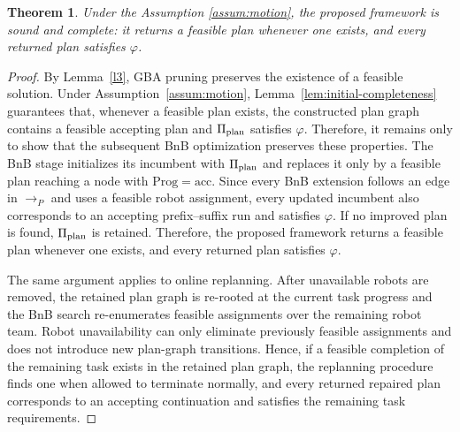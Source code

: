 \documentclass[lettersize,journal]{IEEEtran}
\theoremstyle{italiclemma}
\theoremstyle{italiclemma}
\newtheorem{theorem}{Theorem}
\theoremstyle{definition}
\begin{document}
\begin{theorem}\label{thm:soundness_completeness}
Under the Assumption \ref{assum:motion}, the proposed framework is sound and complete: it returns a feasible plan whenever one exists, and every returned plan satisfies $\varphi$.
\end{theorem}
\begin{proof}
By Lemma~\ref{l3}, GBA pruning preserves the existence of a feasible solution. Under Assumption~\ref{assum:motion},
Lemma~\ref{lem:initial-completeness} guarantees that, whenever a feasible plan exists, the constructed plan graph contains a feasible accepting plan and $\Pi_{\rm plan}$ satisfies $\varphi$.  Therefore, it remains only to show that the subsequent BnB optimization preserves these properties.
The BnB stage initializes its incumbent with $\Pi_{\rm plan}$ and replaces it only by a feasible plan reaching a node with $\mathrm{Prog}=\mathrm{acc}$. Since every BnB extension follows an edge in $\rightarrow_P$ and uses a feasible robot assignment, every updated incumbent also corresponds to an accepting prefix--suffix run and satisfies $\varphi$. If no improved plan is found, $\Pi_{\rm plan}$ is retained. Therefore, the proposed framework returns a feasible plan whenever one exists, and every returned plan satisfies $\varphi$.

The same argument applies to online replanning. After unavailable robots are removed, the retained plan graph is re-rooted at the current task progress and the BnB search re-enumerates feasible assignments over the remaining robot team. Robot unavailability can only eliminate
previously feasible assignments and does not introduce new plan-graph transitions. Hence, if a feasible completion of the remaining task exists in the retained plan graph, the replanning procedure finds one when allowed to terminate normally, and every returned repaired plan corresponds to an accepting continuation and satisfies the remaining
task requirements.
\end{proof}
\end{document}
